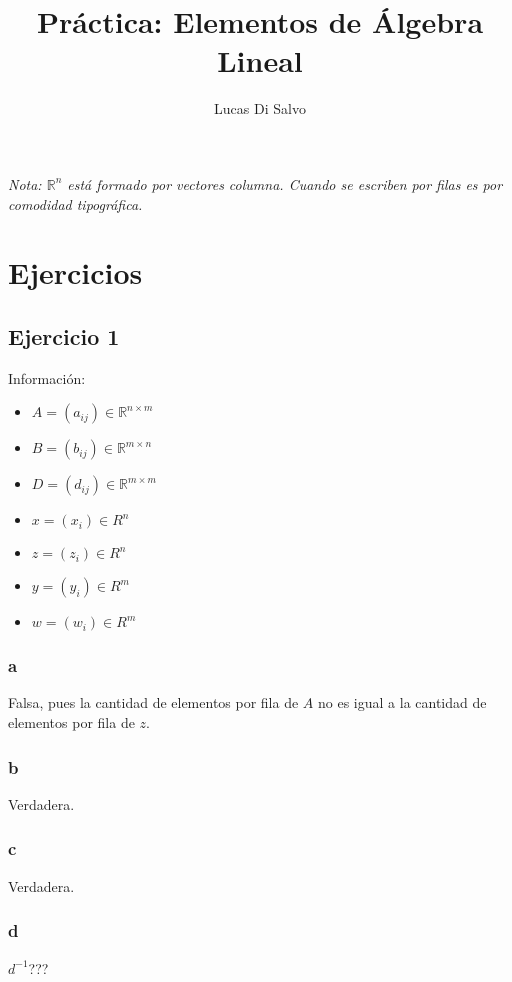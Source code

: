 \documentclass{article}
\title{Práctica: Elementos de Álgebra Lineal}
\author{Lucas Di Salvo}
\date{}
\begin{document}
\maketitle

\emph{Nota: $\mathbb{R}^{n}$ está formado por vectores columna. 
    Cuando se escriben por filas es por comodidad tipográfica.}

\section*{Ejercicios}

\subsection*{Ejercicio 1}

Información:

\begin{multicols}{3}
    \begin{itemize}
        \item[] $A = (a_{ij}) \in \mathbb{R}^{n\times m}$
        \item[] $B = (b_{ij}) \in \mathbb{R}^{m\times n}$
        \item[] $D = (d_{ij}) \in \mathbb{R}^{m\times m}$
        \item[] $x = (x_i) \in R^n$
        \item[] $z = (z_i) \in R^n$
        \item[] $y = (y_i) \in R^m$
        \item[] $w = (w_i) \in R^m$
    \end{itemize}
\end{multicols}


\subsubsection*{a}
Falsa, pues la cantidad de elementos por fila de $A$ no es igual a la cantidad de elementos por fila de $z$.
\subsubsection*{b}
Verdadera.
\subsubsection*{c}
Verdadera.
\subsubsection*{d}
$d^{-1}$???
\end{document}
